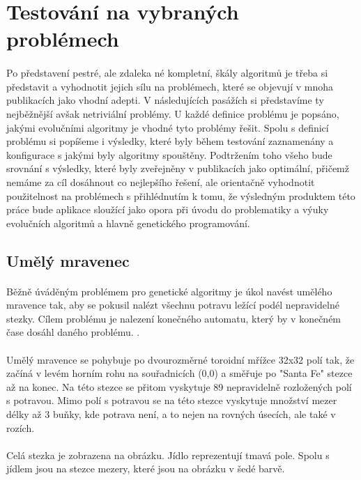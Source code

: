 \documentclass[bc,male,java,dept460]{diploma}		%
\begin{document}
\section{Testování na vybraných problémech}
\paragraph*{}
Po představení pestré, ale zdaleka né kompletní, škály algoritmů je třeba si představit a vyhodnotit jejich sílu na problémech, které se objevují v mnoha publikacích jako vhodní adepti. V následujících pasážích si představíme ty nejběžnější avšak netriviální problémy. U každé definice problému je popsáno, jakými evolučními algoritmy je vhodné tyto problémy řešit. Spolu s definicí problému si popíšeme i výsledky, které byly během testování zaznamenány a konfigurace s jakými byly algoritmy spouštěny. Podtržením toho všeho bude srovnání s výsledky, které byly zveřejněny v publikacích jako optimální, přičemž nemáme za cíl dosáhnout co nejlepšího řešení, ale orientačně vyhodnotit použitelnost na problémech s přihlédnutím k tomu, že výsledným produktem této práce bude aplikace sloužící jako opora při úvodu do problematiky a výuky evolučních algoritmů a hlavně genetického programování.

\subsection{Umělý mravenec}
\paragraph*{}
Běžně úváděným problémem pro genetické algoritmy je úkol navést umělého mravence tak, aby se pokusil nalézt všechnu potravu ležící podél nepravidelné stezky. Cílem problému je nalezení konečného automatu, který by v konečném čase dosáhl daného problému. \cite{gpcm}.

\paragraph*{}
Umělý mravence se pohybuje po dvourozměrné toroidní mřížce 32x32 polí tak, že začíná v levém horním rohu na souřadnicích (0,0) a směřuje po "Santa Fe" stezce až na konec. Na této stezce se přitom vyskytuje 89 nepravidelně rozložených polí s potravou. Mimo polí s potravou se na této stezce vyskytuje množství mezer délky až 3 buňky, kde potrava není, a to nejen na rovných úsecích, ale také v rozích.

\paragraph*{}
Celá stezka je zobrazena na obrázku. Jídlo reprezentují tmavá pole. Spolu s jídlem jsou na stezce mezery, které jsou na obrázku v šedé barvě.
\end{document}
